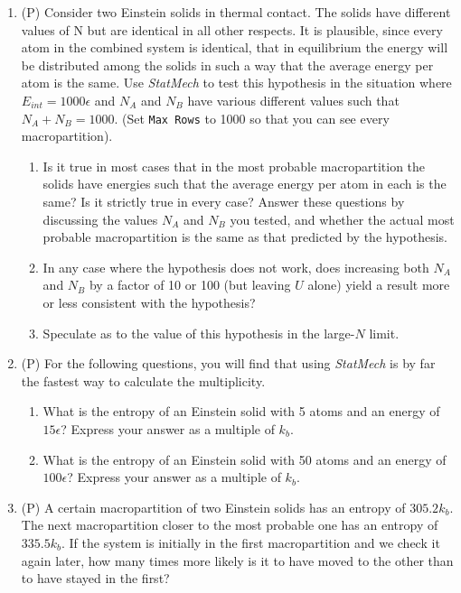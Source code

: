 \begin{enumerate}
\item(P) Consider two Einstein solids in thermal contact.  The solids have different 
values of N but are identical in all other respects.  It is plausible, since every atom 
in the combined system is identical, that in equilibrium the energy will be distributed 
among the solids in such a way that the average energy per atom is the same.  Use {\it StatMech} 
to test this hypothesis in the situation where $E_{int} = 1000\epsilon$ and $N_A$ and $N_B$ have various 
different values such that $N_A + N_B = 1000$.  (Set {\tt Max Rows} to 1000 so that you can see 
every macropartition).
\begin{enumerate}
\item Is it true in most cases that in the most probable macropartition the solids have 
energies such that the average energy per atom in each is the same?  Is it strictly 
true in every case?  Answer these questions by discussing the values $N_A$ and $N_B$ you tested, 
and whether the actual most probable macropartition is the same as that predicted by the hypothesis.
\item In any case where the hypothesis does not work, does increasing both $N_A$ and $N_B$ by a 
factor of 10 or 100 (but leaving $U$ alone) yield a result more or less consistent with 
the hypothesis?
\item Speculate as to the value of this hypothesis in the large-$N$ limit.
\end{enumerate}
\item(P) For the following questions, you will find that using {\it StatMech} is 
by far the fastest way to calculate the multiplicity.
\begin{enumerate}
\item  What is the entropy of an Einstein solid with 5 atoms and an energy of 
$15\epsilon$?  Express your answer as a multiple of $k_b$.
\item  What is the entropy of an Einstein solid with 50 atoms and an energy of $100\epsilon$?  
Express your answer as a multiple of $k_b$.
\end{enumerate}

\item(P) A certain macropartition of two Einstein solids has an entropy of $305.2k_b$.  
The next macropartition closer to the most probable one has an entropy of $335.5k_b$.  
If the system is initially in the first macropartition and we check it again later, 
how many times more likely is it to have moved to the other than to have stayed in the first?


\end{enumerate}
